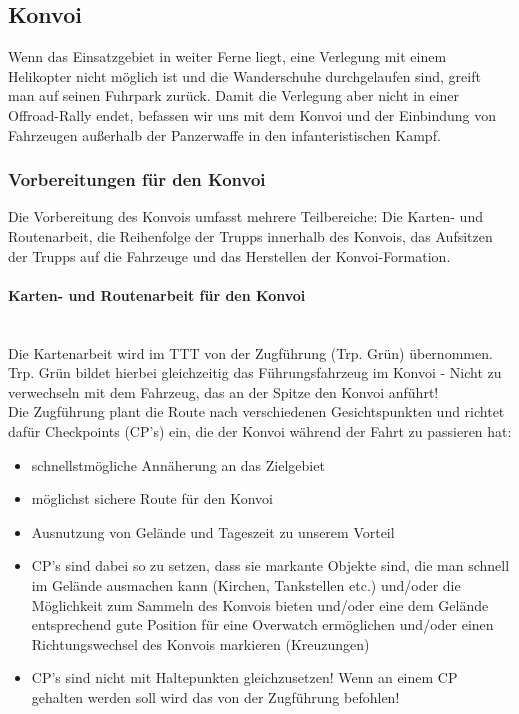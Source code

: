 \newpage
\subsection{Konvoi}
	Wenn das Einsatzgebiet in weiter Ferne liegt, eine Verlegung mit einem Helikopter nicht möglich ist und die Wanderschuhe durchgelaufen sind, greift man auf seinen Fuhrpark zurück. Damit die Verlegung aber nicht in einer Offroad-Rally endet, befassen wir uns mit dem Konvoi und der Einbindung von Fahrzeugen außerhalb der Panzerwaffe in den infanteristischen Kampf. 

\subsubsection{Vorbereitungen für den Konvoi}
	Die Vorbereitung des Konvois umfasst mehrere Teilbereiche: Die Karten- und Routenarbeit, die Reihenfolge der Trupps innerhalb des Konvois, das Aufsitzen der Trupps auf die Fahrzeuge und das Herstellen der Konvoi-Formation.

\paragraph{Karten- und Routenarbeit für den Konvoi} \ \\
	Die Kartenarbeit wird im TTT von der Zugführung (Trp. Grün)  übernommen. Trp. Grün bildet hierbei gleichzeitig das Führungsfahrzeug im Konvoi - Nicht zu verwechseln mit dem Fahrzeug, das an der Spitze den Konvoi anführt! \\
	Die Zugführung plant die Route nach verschiedenen Gesichtspunkten und richtet dafür Checkpoints (CP's) ein, die der Konvoi während der Fahrt zu passieren hat: 

	\begin{itemize}
		\item schnellstmögliche Annäherung an das Zielgebiet
		\item möglichst sichere Route für den Konvoi
		\item Ausnutzung von Gelände und Tageszeit zu unserem Vorteil
		\item CP's sind dabei so zu setzen, dass sie markante Objekte sind, die man schnell im Gelände ausmachen kann (Kirchen, Tankstellen etc.) und/oder die Möglichkeit zum Sammeln des Konvois bieten und/oder eine dem Gelände entsprechend gute Position für eine Overwatch ermöglichen und/oder einen Richtungswechsel des Konvois markieren (Kreuzungen)
		\item CP's sind nicht mit Haltepunkten gleichzusetzen! Wenn an einem CP gehalten werden soll wird das von der Zugführung befohlen!
	\end{itemize}

